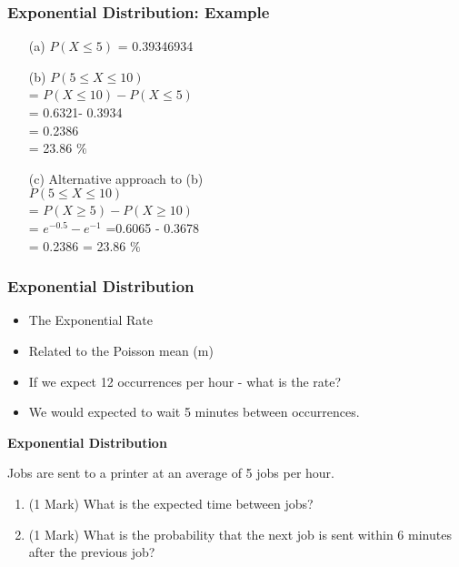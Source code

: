 \documentclass[IntroMain.tex]{subfiles}
\begin{document}
\begin{frame}[fragile]
	\frametitle{Exponential Distribution: Example}
	
	\begin{itemize}
		\item[(a)] $P(X \leq 5)$ = 0.39346934
		\item[(b)] $P(5 \leq X \leq 10)$ \\ = $P( X \leq 10) - P( X \leq 5)$ \\ = 0.6321- 0.3934 \\ = 0.2386 \\= 23.86 $\%$
		\item[(c)] Alternative approach to (b)\\$P(5 \leq X \leq 10)$ \\ = $P( X \geq 5) - P( X \geq 10)$ \\
		= $e^{-0.5} - e^{-1}$
		=0.6065 - 0.3678\\
		= 0.2386 = 23.86 $\%$
	\end{itemize}
	
\end{frame}



\begin{frame}[fragile]
	\frametitle{Exponential Distribution}
	\begin{itemize}
		\item The Exponential Rate
		\item Related to the Poisson mean (m)
		\item If we expect 12 occurrences per hour - what is the rate?
		\item We would expected to wait 5 minutes between occurrences.
	\end{itemize}
\end{frame}





\begin{frame}
	\textbf{Exponential Distribution}
	
	Jobs are sent to a printer at an average of 5 jobs per hour. 
	\begin{enumerate}
		\item (1 Mark)  What is the expected time between jobs? 
		\item (1 Mark)  What is the probability that the next job is sent within 6 minutes after the previous job?
	\end{enumerate}
	
\end{frame}
\end{document}

